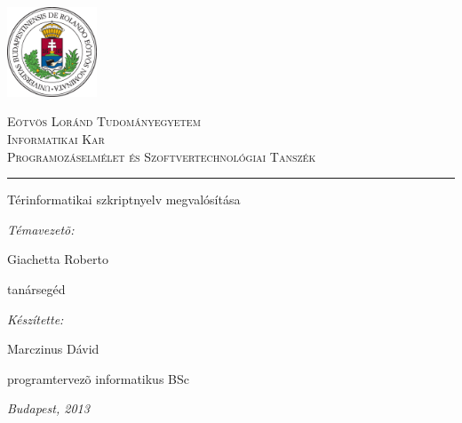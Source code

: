 \begin{titlepage}

\noindent
\parbox[m]{0.2\textwidth}{
 \includegraphics[width=0.2\textwidth]{elte_cimer_szines.eps} %
}
\hfill
\parbox[m]{0.7\textwidth}{
\begin{center}
\begin{large}
\textsc{
Eötvös Loránd Tudományegyetem\\
\vspace{0.5pc}
Informatikai Kar\\
\vspace{0.5pc}
Programozáselmélet és Szoftvertechnológiai Tanszék\\
}
\end{large}
\end{center}
}

\vspace{1pc}
\hrule

\vfill

\begin{center}
{\LARGE Térinformatikai szkriptnyelv megvalósítása}
\end{center}

\vfill

\noindent
\hspace*{0.05\textwidth}
\parbox{0.45\textwidth}{
{\it Témavezetõ:}
\bigskip

{\Large Giachetta Roberto}
\smallskip

tanársegéd
}
\hfill
\parbox{0.45\textwidth}{
{\it Készítette:}
\bigskip

{\Large Marczinus Dávid}
\smallskip

programtervezõ informatikus BSc
}


\vfill

\begin{center}
{\large {\it Budapest, 2013}}
\end{center}

\end{titlepage}
